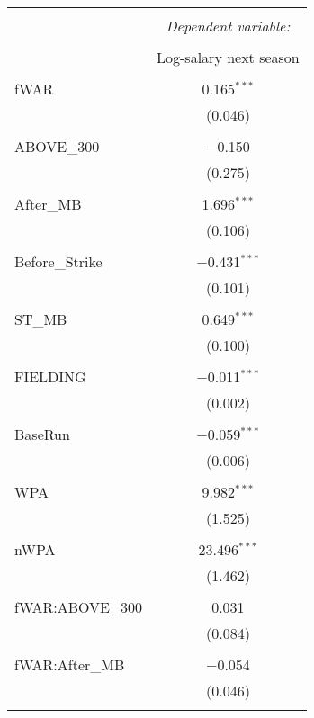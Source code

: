 
\begin{table}[!htbp] \centering
  \caption{}
  \label{}
  \scriptsize
\begin{tabular}{@{\extracolsep{5pt}}lc}
\\[-1.8ex]\hline
\hline \\[-1.8ex]
 & \multicolumn{1}{c}{\textit{Dependent variable:}} \\
\cline{2-2}
\\[-1.8ex] & Log-salary next season \\
\hline \\[-1.8ex]
 fWAR & 0.165$^{***}$ \\
  & (0.046) \\
  & \\
 ABOVE\_300 & $-$0.150 \\
  & (0.275) \\
  & \\
 After\_MB & 1.696$^{***}$ \\
  & (0.106) \\
  & \\
 Before\_Strike & $-$0.431$^{***}$ \\
  & (0.101) \\
  & \\
 ST\_MB & 0.649$^{***}$ \\
  & (0.100) \\
  & \\
 FIELDING & $-$0.011$^{***}$ \\
  & (0.002) \\
  & \\
 BaseRun & $-$0.059$^{***}$ \\
  & (0.006) \\
  & \\
 WPA & 9.982$^{***}$ \\
  & (1.525) \\
  & \\
 nWPA & 23.496$^{***}$ \\
  & (1.462) \\
  & \\
 fWAR:ABOVE\_300 & 0.031 \\
  & (0.084) \\
  & \\
 fWAR:After\_MB & $-$0.054 \\
  & (0.046) \\
  & \\

\end{tabular}
\end{table}
